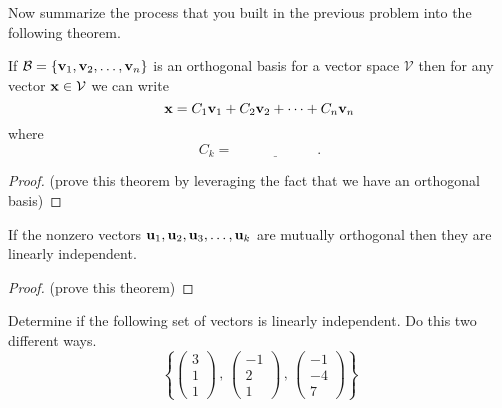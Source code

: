 Now summarize the process that you built in the previous problem into the following
theorem.
\begin{thm}\label{thm:orthogonal_basis}
    If $\mathcal{B} = \{{\bf v}_1, {\bf v}_2, \ldots, {\bf v}_n\}$ is an orthogonal basis for a vector
    space $\mathcal{V}$ then for any vector ${\bf x} \in \mathcal{V}$ we can write
    \[ {\bf x} = C_1 {\bf v}_1 + C_2 {\bf v}_2 + \cdots + C_n {\bf v}_n \]
    where
    \[ C_k = \underline{\hspace{1in}}. \]
\end{thm}
\begin{proof}
    (prove this theorem by leveraging the fact that we have an orthogonal basis)
\end{proof}


\begin{thm}
    If the nonzero vectors ${\bf u}_1, {\bf u}_2, {\bf u}_3, \dots, {\bf u}_k$ are mutually orthogonal
    then they are linearly independent.
\end{thm}
\begin{proof}
    (prove this theorem)
\end{proof}


\begin{problem}
    Determine if the following set of vectors is linearly independent.  Do this two
    different ways.
    \[ \left\{ \begin{pmatrix} 3 \\ 1 \\ 1 \end{pmatrix} \, , \, \begin{pmatrix} -1 \\ 2
            \\ 1
    \end{pmatrix} \, , \, \begin{pmatrix} -1 \\ -4 \\ 7 \end{pmatrix} \right\} \]
\end{problem}







